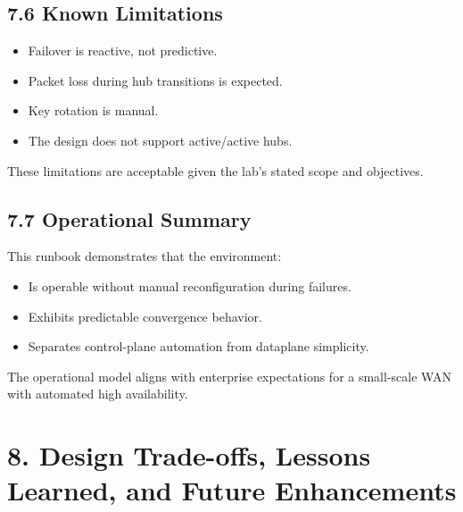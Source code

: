 \documentclass[11pt]{article}
\begin{document}
\subsection{7.6 Known Limitations}
\label{sec:known-limitations}

\begin{itemize}
  \item Failover is reactive, not predictive.
  \item Packet loss during hub transitions is expected.
  \item Key rotation is manual.
  \item The design does not support active/active hubs.
\end{itemize}

These limitations are acceptable given the lab’s stated scope and objectives.

\subsection{7.7 Operational Summary}
\label{sec:operational-summary}

This runbook demonstrates that the environment:
\begin{itemize}
  \item Is operable without manual reconfiguration during failures.
  \item Exhibits predictable convergence behavior.
  \item Separates control-plane automation from dataplane simplicity.
\end{itemize}

The operational model aligns with enterprise expectations for a small-scale WAN with automated high availability.

%
%
%
\section{8. Design Trade-offs, Lessons Learned, and Future Enhancements}
\label{sec:design-tradeoffs}
\end{document}
